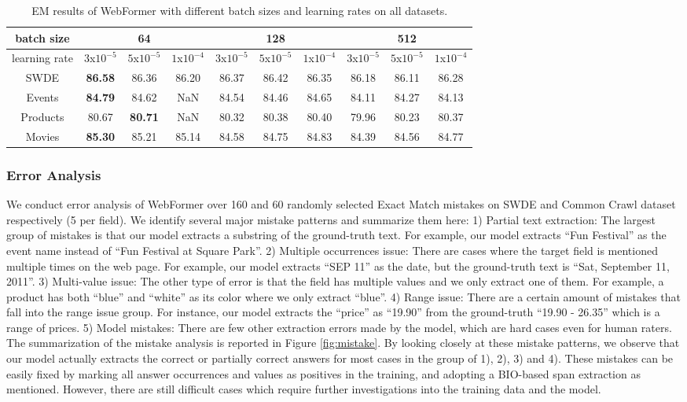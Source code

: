 \documentclass[sigconf]{acmart}
\begin{document}
\begin{table*}
\begin{center}
\begin{tabular}{c|ccc|ccc|ccc}
\hline
batch size & \multicolumn{3}{c|}{64} &\multicolumn{3}{c|}{128} &\multicolumn{3}{c}{512} \\
\hline
learning rate & $3$x$10^{-5}$ &   $5$x$10^{-5}$ & $1$x$10^{-4}$ & $3$x$10^{-5}$ &   $5$x$10^{-5}$ & $1$x$10^{-4}$ & $3$x$10^{-5}$ &   $5$x$10^{-5}$& $1$x$10^{-4}$ \\
\hline
SWDE  & {\bf 86.58} & 86.36 & 86.20 & 86.37& 86.42 & 86.35 & 86.18& 86.11 & 86.28\\
Events & {\bf 84.79}  & 84.62 & NaN & 84.54 & 84.46 & 84.65 & 84.11 & 84.27 & 84.13\\
Products & 80.67  & {\bf 80.71} & NaN &  80.32 & 80.38  & 80.40 &  79.96 & 80.23  & 80.37  \\
Movies & {\bf 85.30} & 85.21 & 85.14 & 84.58 & 84.75& 84.83 & 84.39 & 84.56 & 84.77 \\
\hline
\end{tabular}
\end{center}
\caption{EM results of WebFormer with different batch sizes and learning rates on all datasets.}\label{bs_lr}
\end{table*}

\subsubsection{Error Analysis}
We conduct error analysis of WebFormer over 160 and 60 randomly selected Exact Match mistakes on SWDE and Common Crawl dataset respectively (5 per field). We identify several major mistake patterns and summarize them here: 1) Partial text extraction: The largest group of mistakes is that our model extracts a substring of the ground-truth text. For example, our model extracts ``Fun Festival'' as the event name instead of ``Fun Festival at Square Park''.
2) Multiple occurrences issue: There are cases where the target field is mentioned multiple times on the web page. For example, our model extracts ``SEP 11'' as the date, but the ground-truth text is ``Sat, September 11, 2011''.
3) Multi-value issue: The other type of error is that the field has multiple values and we only extract one of them. For example, a product has both ``blue'' and ``white'' as its color where we only extract ``blue''.
4) Range issue: There are a certain amount of mistakes that fall into the range issue group. For instance, our model extracts the ``price'' as ``19.90'' from the ground-truth ``19.90 - 26.35'' which is a range of prices.
5) Model mistakes: There are few other extraction errors made by the model, which are hard cases even for human raters.
The summarization of the mistake analysis is reported in Figure \ref{fig:mistake}. By looking closely at these mistake patterns, we observe that our model actually extracts the correct or partially correct answers for most cases in the group of 1), 2), 3) and 4). These mistakes can be easily fixed by marking all answer occurrences and values as positives in the training, and adopting a BIO-based span extraction as mentioned. However, there are still difficult cases which require further investigations into the training data and the model.
\end{document}
